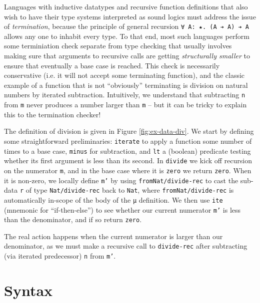 \documentclass{article}
\begin{document}
Languages with inductive datatypes and recursive function definitions that also
wish to have their type systems interpreted as sound logics must address the
issue of \textit{termination}, because the principle of general recursion
\verb;∀ A: ★. (A ➔ A) ➔ A; allows any one to inhabit every type. To that end,
most such languages perform some terminiation check separate from type checking
that usually involves making sure that arguments to recursive calls are
getting \textit{structurally smaller} to ensure that eventually a base case is
reached. This check is necessarily conservative (i.e. it will not accept some
terminating function), and the classic example of a function that is not
``obviously'' terminating is division on natural numbers by iterated
subtraction. Intuitively, we understand that subtracting \texttt{n} from
\texttt{m} never produces a number larger than \texttt{m} -- but it can be
tricky to explain this to the termination checker!

The definition of division is given in Figure \ref{fig:ex-data-div}. We start by
defining some straightforward preliminaries: \texttt{iterate} to apply a
function some number of times to a base case, \texttt{minus} for subtraction,
and \texttt{lt} a (boolean) predicate testing whether its first argument is less
than its second. In \texttt{divide} we kick off recursion on the numerator
\texttt{m}, and in the base case where it is \texttt{zero} we return
\texttt{zero}. When it is non-zero, we locally define \texttt{m'} by using
\texttt{fromNat/divide-rec} to cast the sub-data \texttt{r} of type
\texttt{Nat/divide-rec} back to \texttt{Nat}, where \texttt{fromNat/divide-rec}
is automatically in-scope of the body of the \texttt{μ} definition. We then use
\texttt{ite} (mnemonic for ``if-then-else'') to see whether our current
numerator \texttt{m'} is less than the denominator, and if so return
\texttt{zero}.

The real action happens when the current numerator is larger than our
denominator, as we must make a recursive call to \texttt{divide-rec} after
subtracting (via iterated predecessor) \texttt{n} from \texttt{m'}.

\section{Syntax}
\label{sec:syntax}
\end{document}
